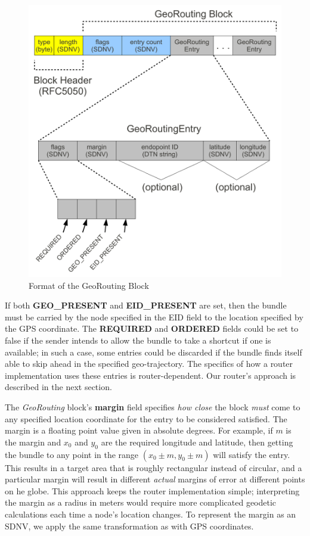 \begin{figure}
\begin{center}
\includegraphics[width=\columnwidth]{figures/georouting-block.pdf}
\end{center}
\vspace{-.75cm}
\caption{Format of the GeoRouting Block}
\label{fig:georouting-block}
\vspace{-.5cm}
\end{figure}

If both {\bf GEO\_PRESENT} and {\bf EID\_PRESENT} are set, then the bundle must be carried by the node specified in the EID field to the location specified by the GPS coordinate.  The {\bf REQUIRED} and {\bf ORDERED} fields could be set to false if the sender intends to allow the bundle to take a shortcut if one is available; in such a case, some entries could be discarded if the bundle finds itself able to skip ahead in the specified geo-trajectory. The specifics of how a router implementation uses these entries is router-dependent. Our router's approach is described in the next section.

The {\em GeoRouting} block's {\bf margin} field specifies {\em how close} the block {\em must} come to any specified location coordinate for the entry to be considered satisfied. The margin is a floating point value given in absolute degrees. For example, if $m$ is the margin and $x_0$ and $y_0$ are the required longitude and latitude, then getting the bundle to any point in the range $(x_0\pm m, y_0\pm m)$ will satisfy the entry.  This results in a target area that is roughly rectangular instead of circular, and a particular margin will result in different {\it actual} margins of error at different points on he globe.  This approach keeps the router implementation simple; interpreting the margin as a radius in meters would require more complicated geodetic calculations each time a node's location changes. To represent the margin as an SDNV, we apply the same transformation as with GPS coordinates.

